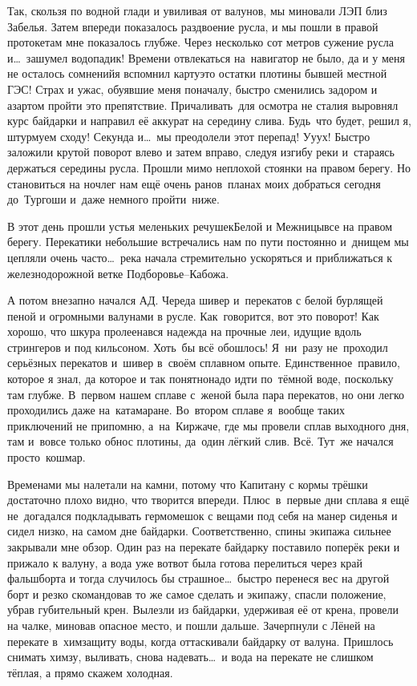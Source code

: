 Так, скользя по водной глади и увиливая от валунов, мы миновали ЛЭП близ Забелья. Затем впереди показалось раздвоение русла, и мы пошли в правой протоке\mdash там мне показалось глубже. Через несколько сот метров сужение русла и\ldots~зашумел водопадик! Времени отвлекаться на~навигатор не было, да и у меня не осталось сомнений\mdash я вспомнил карту\mdash это остатки плотины бывшей местной ГЭС! Страх и ужас, обуявшие меня поначалу, быстро сменились задором и азартом пройти это препятствие. Причаливать~для осмотра не стали\mdash я выровнял курс байдарки и направил её аккурат на середину слива. Будь~что будет, решил я, штурмуем сходу! Секунда и\ldots~мы преодолели этот перепад! У\sdash у\sdash ух! Быстро заложили крутой поворот влево и затем вправо, следуя изгибу реки и~стараясь держаться середины русла. Прошли мимо неплохой стоянки на правом берегу. Но становиться на ночлег нам ещё очень рано\mdash в~планах моих добраться сегодня до~Тургоши и~даже немного пройти~ниже. 

В этот день прошли устья меленьких речушек\mdash Белой и Межницы\mdash все на правом берегу. Перекатики небольшие встречались нам по пути постоянно и~днищем мы цепляли очень часто\ldots~река начала стремительно ускоряться и приближаться к железнодорожной ветке Подборовье\nobreakdash--Кабожа.

А потом внезапно начался АД. Череда шивер и~перекатов с белой бурлящей пеной и огромными валунами в русле. Как~говорится, вот это поворот! Как хорошо, что шкура пролеена\mdash вся надежда на прочные леи, идущие вдоль стрингеров и под кильсоном. Хоть~бы всё обошлось! Я~ни~разу не~проходил серьёзных перекатов и~шивер в~своём сплавном опыте. Единственное~правило, которое я знал, да которое и так понятно\mdash надо идти по~тёмной воде, поскольку там глубже. В~первом нашем сплаве с~женой была пара перекатов, но они легко проходились даже на~катамаране. Во~втором сплаве я~вообще таких приключений не припомню, а~на~Киржаче, где мы провели сплав выходного дня, там и~вовсе только обнос плотины, да~один лёгкий слив. Всё. Тут~же начался просто~кошмар. 

Временами мы налетали на камни, потому что Капитану с кормы трёшки достаточно плохо видно, что творится впереди. Плюс~в~первые дни сплава я ещё не~догадался подкладывать гермомешок с вещами под себя на манер сиденья и сидел низко, на самом дне байдарки. Соответственно, спины экипажа сильнее закрывали мне обзор. Один раз на перекате байдарку поставило поперёк реки и прижало к валуну, а вода уже вот\sdash вот была готова перелиться через край фальшборта и тогда случилось бы страшное\ldots~быстро перенеся вес на другой борт и резко скомандовав то же самое сделать и экипажу, спасли положение, убрав губительный крен. Вылезли из байдарки, удерживая её от крена, провели на чалке, миновав опасное место, и пошли дальше. Зачерпнули с Лёней на перекате в~химзащиту воды, когда оттаскивали байдарку от валуна. Пришлось снимать химзу, выливать, снова надевать\ldots~и вода на перекате не слишком тёплая, а прямо скажем холодная. 

